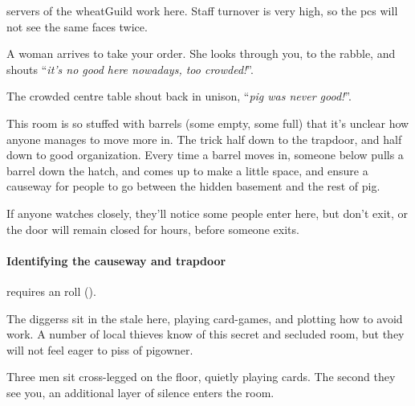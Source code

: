 \begin{multicols}{2}


\Glspl{server} of the \gls{wheatGuild} work here.
Staff turnover is very high, so the \glspl{pc} will not see the same faces twice.

\begin{boxtext}
  A woman arrives to take your order.
  She looks through you, to the rabble, and shouts  ``\textit{it's no good here nowadays, too crowded!}''.

  The crowded centre table shout back in unison, ``\textit{\gls{pig} was never good!}''.
\end{boxtext}

\southCook


This room is so stuffed with barrels (some empty, some full) that it's unclear how anyone manages to move more in.
The trick half down to the trapdoor, and half down to good organization.
Every time a barrel moves in, someone below pulls a barrel down the hatch, and comes up to make a little space, and ensure a causeway for people to go between the hidden basement and the rest of \gls{pig}.

If anyone watches closely, they'll notice some people enter here, but don't exit, or the door will remain closed for hours, before someone exits.

\paragraph{Identifying the causeway and trapdoor}
requires an  roll (\tn[10]).

The \glspl{diggers} sit in the stale here, playing card-games, and plotting how to avoid work.
A number of local thieves know of this secret and secluded room, but they will not feel eager to piss of \gls{pigowner}.

\begin{boxtext}
  Three men sit cross-legged on the floor, quietly playing cards.
  The second they see you, an additional layer of silence enters the room.
\end{boxtext}


\end{multicols}
